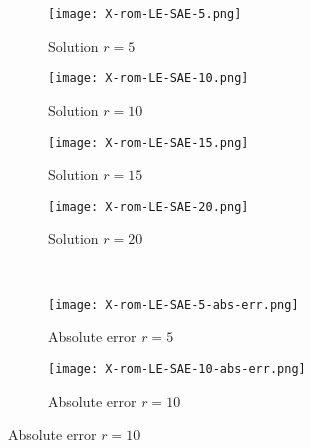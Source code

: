 \begin{figure}[!htb]
     \begin{center}
        \begin{subfigure}[b]{0.23\textwidth}
            \begin{center}
                \texttt{[image: X-rom-LE-SAE-5.png]}
            \end{center}
            \caption{Solution $r = 5$}
        \end{subfigure}
   \begin{subfigure}[b]{0.23\textwidth}
        \begin{center}
            \texttt{[image: X-rom-LE-SAE-10.png]}
        \end{center}
            \caption{Solution $r = 10$}
        \end{subfigure}
   \begin{subfigure}[b]{0.23\textwidth}
       \begin{center}
        \texttt{[image: X-rom-LE-SAE-15.png]}
       \end{center}
            \caption{Solution $r = 15$}
        \end{subfigure}
   \begin{subfigure}[b]{0.23\textwidth}
       \begin{center}
        \texttt{[image: X-rom-LE-SAE-20.png]}
       \end{center}
            \caption{Solution $r = 20$}
        \end{subfigure}\\  
        \begin{subfigure}[b]{0.23\textwidth}
            \begin{center}
                \texttt{[image: X-rom-LE-SAE-5-abs-err.png]}
            \end{center}
            \caption{Absolute error $r = 5$}
        \end{subfigure}  
        \begin{subfigure}[b]{0.23\textwidth}
            \begin{center}
                \texttt{[image: X-rom-LE-SAE-10-abs-err.png]}
            \end{center}
            \caption{Absolute error $r = 10$}
        \end{subfigure}   

\end{center}
\end{figure}
